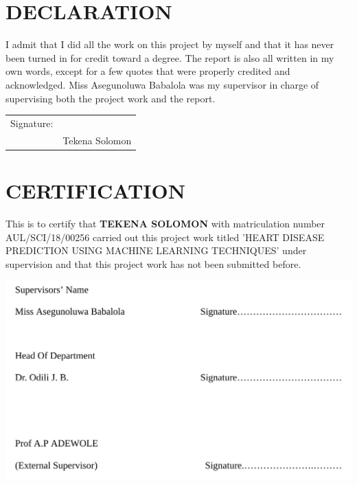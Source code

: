 \documentclass[12pt,paper=a4,oneside,cleardoubleage=plain,final]{report}
\begin{document}

\doublespacing

\clearpage
\setcounter{page}{2}

\chapter*{DECLARATION}
\noindent
I admit that I did all the work on this project by myself and that it has never been turned in for credit toward a degree. The report is also all written in my own words, except for a few quotes that were properly credited and acknowledged. Miss Asegunoluwa Babalola was my supervisor in charge of supervising both the project work and the report.

\vspace{10mm}
\begin{tabular}{@{}p{.5in}p{2in}@{}}
	Signature: & \hrulefill \\
	& Tekena Solomon \\
\end{tabular}

\chapter*{CERTIFICATION}
\noindent
\normalsize This is to certify that \textbf{TEKENA SOLOMON} with matriculation number AUL/SCI/18/00256 carried out this project work titled 'HEART DISEASE PREDICTION USING MACHINE LEARNING TECHNIQUES' under supervision and that this project work has not been submitted before. \\[1.0cm]

\vspace{0.8cm}


\begin{center}
	\includegraphics[scale=1]{signers.png}
\end{center}
\end{document}
